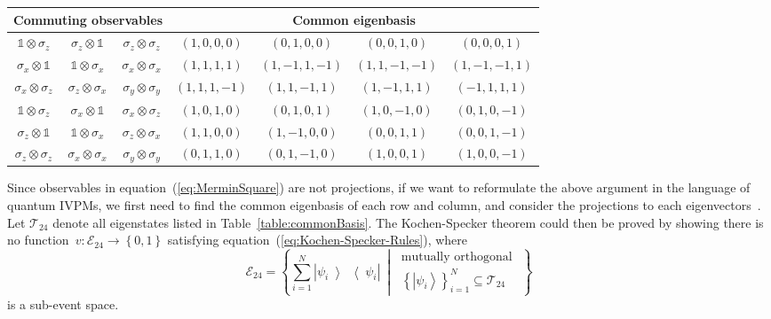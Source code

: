 \documentclass[english,reprint, aps, prl,superscriptaddress, showpacs,
showkeys]{revtex4-1}
\theoremstyle{plain}
\theoremstyle{definition}
\newcommand{\events}{\ensuremath{\mathcal{E}}}
\newcommand{\ket}[1]{{\left\vert{#1}\right\rangle}}
\newcommand{\op}[2]{\ensuremath{\left\vert{#1}\middle\rangle\middle\langle{#2}\right\vert}}
\newcommand{\proj}[1]{\op{#1}{#1}}
\newcommand{\set}[2]{\ensuremath{\left\{ {#1}~\middle|~{#2}\right\} }}
\begin{document}
\begin{table*}
\caption{\label{table:commonBasis}In each row, three observables are listed
in the left column commutes, and their common eigenbasis is listed
in the right column. In order to unify and simplify the notation,
we do not normalize eigenstates, and represent the state~$\alpha_{0}\ket{0}+\alpha_{1}\ket{1}+\alpha_{2}\ket{2}+\alpha_{3}\ket{3}$
as $\left(\alpha_{0},\alpha_{1},\alpha_{2},\alpha_{3}\right)$.}

\begin{ruledtabular}
\begin{tabular}{ccc|cccc}
\multicolumn{3}{c}{Commuting observables} & \multicolumn{4}{c}{Common eigenbasis}\tabularnewline
\hline 
$\mathbb{1}\otimes\sigma_{z}$  & $\sigma_{z}\otimes\mathbb{1}$  & $\sigma_{z}\otimes\sigma_{z}$  & $(1,0,0,0)$  & $(0,1,0,0)$  & $(0,0,1,0)$  & $(0,0,0,1)$ \tabularnewline
$\sigma_{x}\otimes\mathbb{1}$  & $\mathbb{1}\otimes\sigma_{x}$  & $\sigma_{x}\otimes\sigma_{x}$  & $(1,1,1,1)$  & $(1,-1,1,-1)$  & $(1,1,-1,-1)$  & $(1,-1,-1,1)$ \tabularnewline
$\sigma_{x}\otimes\sigma_{z}$  & $\sigma_{z}\otimes\sigma_{x}$  & $\sigma_{y}\otimes\sigma_{y}$  & $(1,1,1,-1)$  & $(1,1,-1,1)$  & $(1,-1,1,1)$  & $(-1,1,1,1)$ \tabularnewline
$\mathbb{1}\otimes\sigma_{z}$  & $\sigma_{x}\otimes\mathbb{1}$  & $\sigma_{x}\otimes\sigma_{z}$  & $(1,0,1,0)$  & $(0,1,0,1)$  & $(1,0,-1,0)$  & $(0,1,0,-1)$ \tabularnewline
$\sigma_{z}\otimes\mathbb{1}$  & $\mathbb{1}\otimes\sigma_{x}$  & $\sigma_{z}\otimes\sigma_{x}$  & $(1,1,0,0)$  & $(1,-1,0,0)$  & $(0,0,1,1)$  & $(0,0,1,-1)$ \tabularnewline
$\sigma_{z}\otimes\sigma_{z}$  & $\sigma_{x}\otimes\sigma_{x}$  & $\sigma_{y}\otimes\sigma_{y}$  & $(0,1,1,0)$  & $(0,1,-1,0)$  & $(1,0,0,1)$  & $(1,0,0,-1)$ \tabularnewline
\end{tabular}
\end{ruledtabular}

\end{table*}

Since observables in equation~(\ref{eq:MerminSquare}) are not projections,
if we want to reformulate the above argument in the language of quantum
IVPMs, we first need to find the common eigenbasis of each row and
column, and consider the projections to each eigenvectors~\citep{Kernaghan1994,peres1995quantum}.
Let $\mathcal{T}_{24}$ denote all eigenstates listed in Table~\ref{table:commonBasis}.
The Kochen-Specker theorem could then be proved by showing there is
no function~$v:\events_{24}\rightarrow\left\{ 0,1\right\} $ satisfying
equation~(\ref{eq:Kochen-Specker-Rules}), where 
\begin{equation}
\events_{24}=\set{\sum_{i=1}^{N}\proj{\psi_{i}}}{\begin{gathered}\textrm{mutually orthogonal }\\
\left\{ \ket{\psi_{i}}\right\} _{i=1}^{N}\subseteq\mathcal{T}_{24}
\end{gathered}
}
\end{equation}
is a sub-event space.
\end{document}
